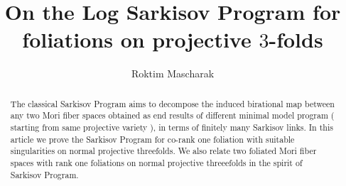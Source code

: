 \documentclass[12pt]{amsart}%
\author{Roktim Mascharak}
\title{ On the Log Sarkisov Program for foliations on projective $3$-folds}
\theoremstyle{plain}
\theoremstyle{remark}
\theoremstyle{definition}
\newcommand{\<}{\leq}
\theoremstyle{definition}
\theoremstyle{definition}
\numberwithin{equation}{section}
\theoremstyle{remark}
\begin{document}
\maketitle
\begin{abstract}
    The classical Sarkisov Program aims to decompose the induced birational map between any two Mori fiber spaces obtained as end results of different minimal model program ( starting from same projective variety ), in terms of finitely many Sarkisov links. In this article we prove the Sarkisov Program for co-rank one foliation with suitable singularities on normal projective threefolds. We also relate two foliated Mori fiber spaces with rank one foliations on normal projective threeefolds in the spirit of Sarkisov Program.  
\end{abstract}
\tableofcontents
\end{document}
